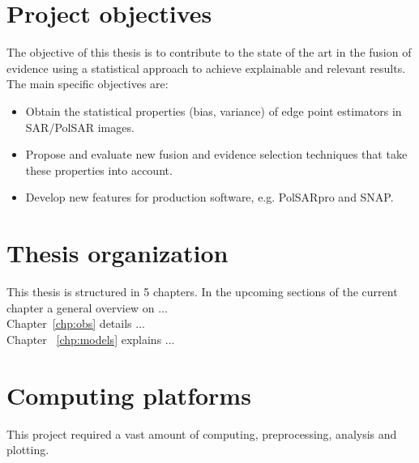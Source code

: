 \section{Project objectives}
The objective of this thesis is to contribute to the state of the art in the fusion of evidence using a statistical approach to achieve explainable and relevant results. \\

The main specific objectives are:

\begin{itemize}
	\item Obtain the statistical properties (bias, variance) of edge point estimators in SAR/PolSAR images.
	\item Propose and evaluate new fusion and evidence selection techniques that take these properties into account.
	\item Develop new features for production software, e.g. PolSARpro and SNAP.
\end{itemize}

\section{Thesis organization}\label{sec:research_questions}

\hypersetup{linkcolor=blue}

This thesis is structured in 5 chapters. In the upcoming sections of the current chapter a general overview on ... \\
 Chapter~\ref{chp:obs} details ...\\
Chapter ~\ref{chp:models} explains ...


\section{Computing platforms}
This  project required a vast amount of computing, preprocessing, analysis and plotting.

